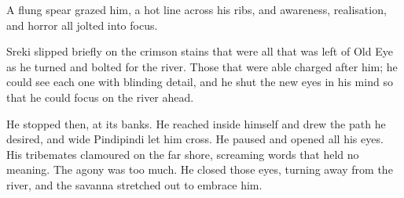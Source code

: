 A flung spear grazed him, a hot line across his ribs, and awareness, realisation, and horror all jolted into focus.

Sreki slipped briefly on the crimson stains that were all that was left of Old Eye as he turned and bolted for the river. Those that were able charged after him; he could see each one with blinding detail, and he shut the new eyes in his mind so that he could focus on the river ahead.

He stopped then, at its banks. He reached inside himself and drew the path he desired, and wide Pindipindi let him cross. He paused and opened all his eyes. His tribemates clamoured on the far shore, screaming words that held no meaning. The agony was too much. He closed those eyes, turning away from the river, and the savanna stretched out to embrace him.

